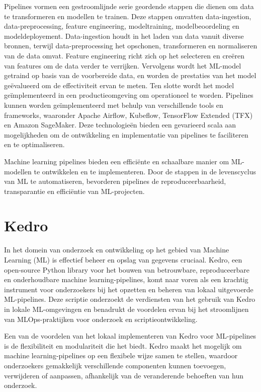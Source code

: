 Pipelines vormen een gestroomlijnde serie geordende stappen die dienen om data te transformeren en modellen te trainen. Deze stappen omvatten data-ingestion, data-preprocessing, feature engineering, modeltraining, modelbeoordeling en modeldeployement. Data-ingestion houdt in het laden van data vanuit diverse bronnen, terwijl data-preprocessing het opschonen, transformeren en normaliseren van de data omvat. Feature engineering richt zich op het selecteren en creëren van features om de data verder te verrijken. Vervolgens wordt het ML-model getraind op basis van de voorbereide data, en worden de prestaties van het model geëvalueerd om de effectiviteit ervan te meten. Ten slotte wordt het model geïmplementeerd in een productieomgeving om operationeel te worden. Pipelines kunnen worden geïmplementeerd met behulp van verschillende tools en frameworks, waaronder Apache Airflow, Kubeflow, TensorFlow Extended (TFX) en Amazon SageMaker. Deze technologieën bieden een gevarieerd scala aan mogelijkheden om de ontwikkeling en implementatie van pipelines te faciliteren en te optimaliseren.


Machine learning pipelines bieden een efficiënte en schaalbare manier om ML-modellen te ontwikkelen en te implementeren. Door de stappen in de levenscyclus van ML te automatiseren, bevorderen pipelines de reproduceerbaarheid, transparantie en efficiëntie van ML-projecten.
\section{Kedro}

In het domein van onderzoek en ontwikkeling op het gebied van Machine Learning (ML) is effectief beheer en opslag van gegevens cruciaal. Kedro, een open-source Python library voor het bouwen van betrouwbare, reproduceerbare en onderhoudbare machine learning-pipelines, komt naar voren als een krachtig instrument voor onderzoekers bij het opzetten en beheren van lokaal uitgevoerde ML-pipelines. Deze scriptie onderzoekt de verdiensten van het gebruik van Kedro in lokale ML-omgevingen en benadrukt de voordelen ervan bij het stroomlijnen van MLOps-praktijken voor onderzoek en scriptieontwikkeling.

Een van de voordelen van het lokaal implementeren van Kedro voor ML-pipelines is de flexibiliteit en modulariteit die het biedt. Kedro maakt het mogelijk om machine learning-pipelines op een flexibele wijze samen te stellen, waardoor onderzoekers gemakkelijk verschillende componenten kunnen toevoegen, verwijderen of aanpassen, afhankelijk van de veranderende behoeften van hun onderzoek.

